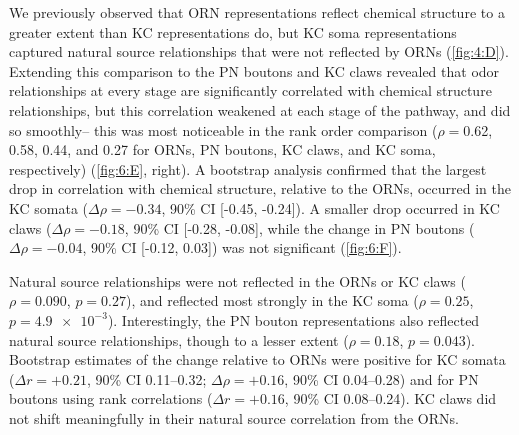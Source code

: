 \documentclass[12pt]{caltech_thesis}
\begin{document}
\begin{refsection}
We previously observed that ORN representations reflect chemical structure to a greater extent than KC representations do, but KC soma representations captured natural source relationships that were not reflected by ORNs (\cref{fig:4:D}).
Extending this comparison to the PN boutons and KC claws revealed that odor relationships at every stage are significantly correlated with chemical structure relationships, but this correlation weakened at each stage of the pathway, and did so smoothly-- this was most noticeable in the rank order comparison ($\rho {=}$0.62, 0.58, 0.44, and 0.27 for ORNs, PN boutons, KC claws, and KC soma, respectively) (\cref{fig:6:E}, right).
A bootstrap analysis confirmed that the largest drop in correlation with chemical structure, relative to the ORNs, occurred in the KC somata ($\Delta \rho {=} -0.34$, 90\% CI [-0.45, -0.24]).
A smaller drop occurred in KC claws ($\Delta \rho {=} -0.18$, 90\% CI [-0.28, -0.08], while the change in PN boutons ($\Delta \rho {=} -0.04$, 90\% CI [-0.12, 0.03]) was not significant (\cref{fig:6:F}).

Natural source relationships were not reflected in the ORNs or KC claws ($\rho {=}0.090$, $p{=}0.27$), and reflected most strongly in the KC soma ($\rho {=}0.25$, $p{=}\num{4.9e-3}$).
Interestingly, the PN bouton representations also reflected natural source relationships, though to a lesser extent ($\rho {=}0.18$, $p{=}0.043$).
Bootstrap estimates of the change relative to ORNs were positive for KC somata ($\Delta r = +0.21$, 90\% CI \numrange{0.11}{0.32}; $\Delta \rho {=} +0.16$, 90\% CI \numrange{0.04}{0.28}) and for PN boutons using rank correlations ($\Delta r = +0.16$, 90\% CI \numrange{0.08}{0.24}).
KC claws did not shift meaningfully in their natural source correlation from the ORNs. 


\end{refsection}
\end{document}
